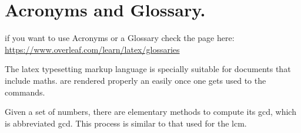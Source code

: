 \chapter{Acronyms and Glossary.}

if you want to use Acronyms or a Glossary check the page here: \url{https://www.overleaf.com/learn/latex/glossaries}

The \Gls{latex} typesetting markup language is specially suitable 
for documents that include \gls{maths}. are 
rendered properly an easily once one gets used to the commands.

Given a set of numbers, there are elementary methods to compute 
its \acrlong{gcd}, which is abbreviated \acrshort{gcd}. This 
process is similar to that used for the \acrfull{lcm}.